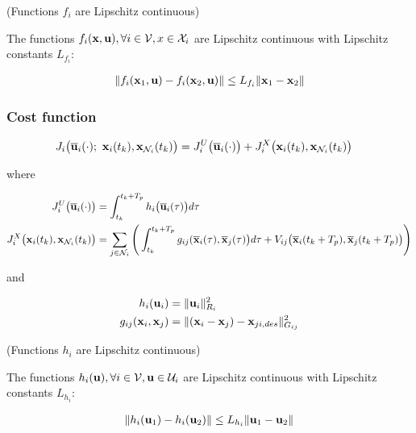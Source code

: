 \begin{gg_box}
\begin{assumption} (Functions $f_i$ are Lipschitz continuous)

  The functions $f_i(\bm{\mathbf{x}}, \bm{\mathbf{u}}), \forall i \in \mathcal{V}, x \in \mathcal{X}_i$
  are Lipschitz continuous with Lipschitz constants $L_{f_i}$:

  \begin{align}
    \| f_i(\bm{\mathbf{x}}_1, \bm{\mathbf{u}}) - f_i(\bm{\mathbf{x}}_2, \bm{\mathbf{u}})\| \leq L_{f_i} \|\bm{\mathbf{x}}_1 - \bm{\mathbf{x}}_2 \|
  \end{align}

  \label{ass:f_i_Lipschitz}
\end{assumption}
\end{gg_box}


\subsubsection{Cost function}

\begin{align}
  J_i \big(\overline{\bm{\mathbf{u}}}_i (\cdot);\ \bm{\mathbf{x}}_i(t_k), \bm{\mathbf{x}}_{\mathcal{N}_i}(t_k)\big) &=
    J_i^U \big(\overline{\bm{\mathbf{u}}}_i (\cdot) \big) +
    J_i^X \big(\bm{\mathbf{x}}_i (t_k), \bm{\mathbf{x}}_{\mathcal{N}_i}(t_k)\big)
\end{align}

where

\begin{align}
  J_i^U \big(\overline{\bm{\mathbf{u}}}_i (\cdot)\big) &=
    \int_{t_k}^{t_k + T_p} h_i \big(\overline{\bm{\mathbf{u}}}_i (\tau)\big) d \tau \\
  J_i^X \big(\bm{\mathbf{x}}_i (t_k), \bm{\mathbf{x}}_{\mathcal{N}_i}(t_k)\big) &=
    \sum_{j \in \mathcal{N}_i} \Bigg(\int_{t_k}^{t_k + T_p} g_{ij} (\overline{\bm{\mathbf{x}}}_i (\tau), \overline{\bm{\mathbf{x}}}_j (\tau)\big) d \tau +
    V_{ij} \big(\overline{\bm{\mathbf{x}}}_i (t_k + T_p), \overline{\bm{\mathbf{x}}}_j (t_k + T_p)\big)\Bigg)
\end{align}

and

\begin{align}
  h_i(\bm{\mathbf{u}}_i) &=\| \bm{\mathbf{u}}_i\|_{R_i}^2 \\
  g_{ij}(\bm{\mathbf{x}}_i, \bm{\mathbf{x}}_j) &= \| (\bm{\mathbf{x}}_i - \bm{\mathbf{x}}_j) - \bm{\mathbf{x}}_{ji,des} \|_{G_{ij}}^2
\end{align}


\begin{gg_box}
\begin{assumption} (Functions $h_i$ are Lipschitz continuous)

  The functions $h_i(\bm{\mathbf{u}}), \forall i \in \mathcal{V}, \bm{\mathbf{u}} \in \mathcal{U}_i$ are
  Lipschitz continuous with Lipschitz constants $L_{h_i}$:

  \begin{align}
    \| h_i(\bm{\mathbf{u}}_1) - h_i(\bm{\mathbf{u}}_2)\| \leq L_{h_i} \|\bm{\mathbf{u}}_1 - \bm{\mathbf{u}}_2 \|
  \end{align}

  \label{ass:h_i_Lipschitz}
\end{assumption}
\end{gg_box}

